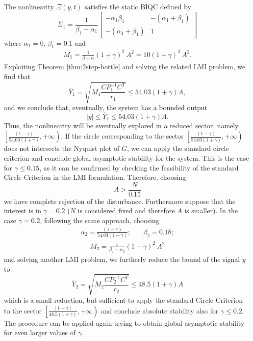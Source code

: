 \documentclass[letterpaper,10pt,conference,twocolumn]{IEEEtran}
\begin{document}
The nonlinearity $\Xi(y,t)$ satisfies the static BIQC defined by
\begin{equation*}
	\Sigma_1=\frac{1}{\beta_1-\alpha_1}
		\left[\begin{array}{cc}
			-\alpha_1 \beta_1	& -(\alpha_1+\beta_1)\\
			-(\alpha_1+\beta_1)	& 1
		      \end{array}
		\right]
\end{equation*}
where $\alpha_1=0$, $\beta_1=0.1$ and
\begin{align*}
	M_1=\frac{1}{\beta-\alpha}(1+\gamma)^2~A ^2=10(1+\gamma)^2~A^2.
\end{align*}
Exploiting Theorem \ref{thm:2step-bottle} and solving the related LMI problem, we find that
\begin{equation*}
	\bar Y_1 =  \sqrt{M_1 \frac{CP_1^{-1}C^T}{r_1}}\leq 54.03 (1+\gamma)A,
\end{equation*}
and we conclude that, eventually, the system has a bounded output
\begin{equation*}
	|y|\leq \bar Y_1 \leq 54.03 (1+\gamma)A.
\end{equation*}
Thus, the nonlinearity will be eventually explored in a reduced sector, namely 
$\left[\frac{(1-\gamma)}{54.03(1+\gamma)}, +\infty\right)$.
If the circle corresponding to the sector
$\left[\frac{(1-\gamma)}{54.03(1+\gamma)}, +\infty\right)$
does not intersects the Nyquist plot of $G$, we can apply the standard circle criterion
and conclude global asymptotic stability for the system.
This is the case for $\gamma\leq 0.15$, as it can be confirmed by checking the feasibility
of the standard Circle Criterion in the LMI formulation. Therefore, choosing
\begin{equation}
	A>\frac{N}{0.15}
\end{equation}
we have complete rejection of the disturbance.
Furthermore suppose that the interest is in $\gamma=0.2$ ($N$ is considered fixed and therefore $A$ is smaller).
In the case $\gamma=0.2$, following the same approach, choosing
\begin{align*}
	\alpha_2=\frac{(1-\gamma)}{54.03(1+\gamma)};
	& \quad \beta_2=0.18;
\end{align*}
\begin{align*}
	M_2=\frac{1}{\beta_2-\alpha_2}(1+\gamma)^2~A ^2
\end{align*}
and solving another LMI problem, we furtherly reduce the bound of the signal $y$ to
\begin{equation*}
	\bar Y_2 =  \sqrt{M_2 \frac{CP_2^{-1}C^T}{r_2}}\leq 48.5(1+\gamma)A
\end{equation*}
which is a small reduction, but sufficient to apply the standard Circle Criterion
to the sector $\left[\frac{(1-\gamma)}{48.5(1+\gamma)}, +\infty \right)$
and conclude absolute stability also for $\gamma\leq 0.2$.
The procedure can be applied again trying to obtain global asymptotic stability
for even larger values of $\gamma$.
\end{document}
